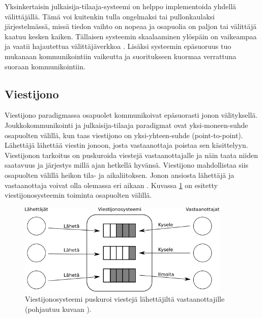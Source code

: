 Yksinkertaisin julkaisija-tilaaja-systeemi on helppo implementoida yhdellä välittäjällä. Tämä voi kuitenkin tulla ongelmaksi tai pullonkaulaksi järjestelmässä, missä tiedon vaihto on nopeaa ja osapuolia on paljon tai välittäjä kaatuu kesken kaiken. Tällaisen systeemin skaalaaminen ylöspäin on vaikeampaa ja vaatii hajautettua välittäjäverkkoa \cite[s.~248--249]{distributed-systems-concepts-and-design}. Lisäksi systeemin epäsuoruus tuo mukanaan kommunikointiin vaikeutta ja suoritukseen kuormaa verrattuna suoraan kommunikointiin.


\subsection{Viestijono}
Viestijono paradigmassa osapuolet kommunikoivat epäsuorasti jonon välityksellä. Joukkokommunikointi ja julkaisija-tilaaja paradigmat ovat yksi-moneen-suhde osapuolten välillä, kun taas viestijono on yksi-yhteen-suhde (point-to-point). Lähettäjä lähettää viestin jonoon, josta vastaanottaja poistaa sen käsittelyyn. Viestijonon tarkoitus on puskuroida viestejä vastaanottajalle ja näin taata niiden saatavuus ja järjestys millä ajan hetkellä hyvänsä. Viestijono mahdollistaa siis osapuolten välillä heikon tila- ja aikaliitoksen. Jonon ansiosta lähettäjä ja vastaanottaja voivat olla olemassa eri aikaan \cite[s.~254]{distributed-systems-concepts-and-design}. Kuvassa \ref{fig:message-queue-communication} on esitetty viestijonosysteemin toiminta osapuolten välillä.

\begin{figure}[ht!]
	\includegraphics[width=0.9\textwidth]{pictures/message-queue.png}
	\caption{Viestijonosysteemi puskuroi viestejä lähettäjiltä vastaanottajille (pohjautuu kuvaan \mbox{\cite[s.~255]{distributed-systems-concepts-and-design}}).}
	\label{fig:message-queue-communication}
\end{figure}

